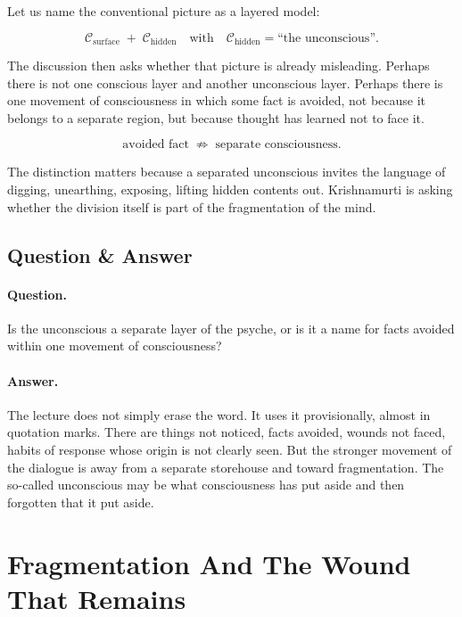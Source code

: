 Let us name the conventional picture as a layered model:

\begin{equation}
\mathcal{C}_{\text{surface}} \;+\; \mathcal{C}_{\text{hidden}}
\quad\text{with}\quad
\mathcal{C}_{\text{hidden}} = \text{``the unconscious''}.
\end{equation}

The discussion then asks whether that picture is already misleading. Perhaps there is not one conscious layer and another unconscious layer. Perhaps there is one movement of consciousness in which some fact is avoided, not because it belongs to a separate region, but because thought has learned not to face it.

\begin{equation}
\text{avoided fact} \;\not\Rightarrow\; \text{separate consciousness}.
\end{equation}

The distinction matters because a separated unconscious invites the language of digging, unearthing, exposing, lifting hidden contents out. Krishnamurti is asking whether the division itself is part of the fragmentation of the mind.

\subsection{Question \& Answer}

\paragraph{Question.}
Is the unconscious a separate layer of the psyche, or is it a name for facts avoided within one movement of consciousness?

\paragraph{Answer.}
The lecture does not simply erase the word. It uses it provisionally, almost in quotation marks. There are things not noticed, facts avoided, wounds not faced, habits of response whose origin is not clearly seen. But the stronger movement of the dialogue is away from a separate storehouse and toward fragmentation. The so-called unconscious may be what consciousness has put aside and then forgotten that it put aside.

\section{Fragmentation And The Wound That Remains}

